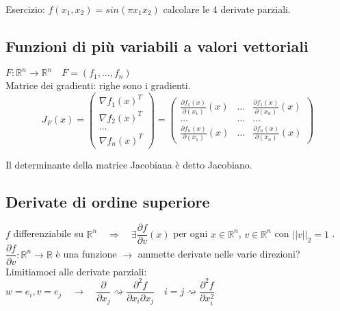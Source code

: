 Esercizio: $f(x_1, x_2)= sin(\pi x_1 x_2)$ calcolare le 4 derivate parziali.

\subsection{Funzioni  di pi\`u variabili a valori vettoriali}%
\begin{defn}
$F: \mathbb{R}^{n} \rightarrow \mathbb{R}^{n} \quad
F=(f_1,\ldots, f_n)$ \\
Matrice dei gradienti: righe sono i gradienti.
$$ J_{F}(x) =
\begin{pmatrix}
\nabla f_1(x)^{T} \\
 \nabla f_2(x)^{T} \\
 \ldots \\
\nabla f_n(x)^{T} 
\end{pmatrix} =
\begin{pmatrix}
\frac{{\partial} f_1(x)}{{\partial}(x_1)}(x) & \ldots &  \frac{{\partial} f_1(x)}{{\partial}(x_n)}(x)\\
 \ldots & \ldots & \ldots \\
\frac{{\partial} f_n(x)}{{\partial}(x_1)}(x) & \ldots &  \frac{{\partial} f_n(x)}{{\partial}(x_n)}(x)
\end{pmatrix}
$$
\end{defn}
Il determinante della matrice Jacobiana \`e detto Jacobiano.

\subsection{Derivate di ordine superiore}
$f$ differenziabile su $\mathbb{R}^{n} 
\quad 
\Rightarrow
\quad 
\exists
\dfrac{\partial f }{\partial v}(x)
$
per ogni $x \in \mathbb{R}^{n}$, $v\in \mathbb{R}^{n}$ con 
$||v||_2 =1$ . \\
$\dfrac{\partial f }{\partial v}:
\mathbb{R}^{n} \rightarrow \mathbb{R}$ \`e una funzione
$\rightarrow$ ammette derivate nelle varie direzioni? \\
Limitiamoci alle derivate parziali: $w=e_i, v=e_j
\quad \rightarrow \quad
\dfrac{\partial}{\partial x_j} \rightsquigarrow
\dfrac{\partial^{2}f}{\partial x_i \partial x_j}
\quad
i=j \rightsquigarrow \dfrac{\partial^{2}f}{\partial x_i^{2}}
$


